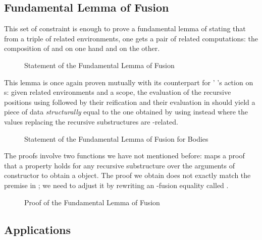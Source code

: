 
\subsection{Fundamental Lemma of Fusion}

This set of constraint is enough to prove a fundamental lemma of  stating
that from a triple of related environments, one gets a pair of related computations:
the composition of  and  on one hand and  on the other.

\begin{figure}[h]
\caption{Statement of the Fundamental Lemma of Fusion\label{fig:fusiontype}}
\end{figure}

This lemma is once again proven mutually with its counterpart for '
's action on s: given related environments and a scope, the
evaluation of the recursive positions using  followed by their reification
and their evaluation in  should yield a piece of data \emph{structurally}
equal to the one obtained by using  instead where the values replacing
the recursive substructures are -related.

\begin{figure}[h]
\caption{Statement of the Fundamental Lemma of Fusion for Bodies\label{fig:fusiontype}}
\end{figure}

The proofs involve two functions we have not mentioned before:  maps a proof that
a property holds for any recursive substructure over the arguments of constructor to
obtain a  object. The proof we obtain does not exactly match the premise in
; we need to adjust it by rewriting an -fusion equality called
.

\begin{figure}[h]
\caption{Proof of the Fundamental Lemma of Fusion}
\end{figure}

\subsection{Applications}

